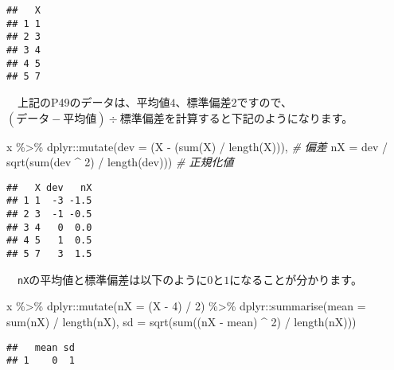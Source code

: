 \documentclass[
  12pt,
]{book}
\newenvironment{Shaded}{\begin{snugshade}}{\end{snugshade}}
\newcommand{\AttributeTok}[1]{\textcolor[rgb]{0.77,0.63,0.00}{#1}}
\newcommand{\CommentTok}[1]{\textcolor[rgb]{0.56,0.35,0.01}{\textit{#1}}}
\newcommand{\DecValTok}[1]{\textcolor[rgb]{0.00,0.00,0.81}{#1}}
\newcommand{\FunctionTok}[1]{\textcolor[rgb]{0.00,0.00,0.00}{#1}}
\newcommand{\NormalTok}[1]{#1}
\newcommand{\SpecialCharTok}[1]{\textcolor[rgb]{0.00,0.00,0.00}{#1}}
\begin{document}
\begin{verbatim}
##   X
## 1 1
## 2 3
## 3 4
## 4 5
## 5 7
\end{verbatim}

　上記のP49のデータは、平均値\(4\)、標準偏差\(2\)ですので、\((データ - 平均値) \div 標準偏差\)を計算すると下記のようになります。

\begin{Shaded}
\begin{Highlighting}[]
\NormalTok{x }\SpecialCharTok{\%\textgreater{}\%} 
\NormalTok{  dplyr}\SpecialCharTok{::}\FunctionTok{mutate}\NormalTok{(}\AttributeTok{dev =}\NormalTok{ (X }\SpecialCharTok{{-}}\NormalTok{ (}\FunctionTok{sum}\NormalTok{(X) }\SpecialCharTok{/} \FunctionTok{length}\NormalTok{(X))),            }\CommentTok{\# 偏差}
                \AttributeTok{nX =}\NormalTok{ dev }\SpecialCharTok{/} \FunctionTok{sqrt}\NormalTok{(}\FunctionTok{sum}\NormalTok{(dev }\SpecialCharTok{\^{}} \DecValTok{2}\NormalTok{) }\SpecialCharTok{/} \FunctionTok{length}\NormalTok{(dev))) }\CommentTok{\# 正規化値}
\end{Highlighting}
\end{Shaded}

\begin{verbatim}
##   X dev   nX
## 1 1  -3 -1.5
## 2 3  -1 -0.5
## 3 4   0  0.0
## 4 5   1  0.5
## 5 7   3  1.5
\end{verbatim}

　\texttt{nX}の平均値と標準偏差は以下のように\(0\)と\(1\)になることが分かります。

\begin{Shaded}
\begin{Highlighting}[]
\NormalTok{x }\SpecialCharTok{\%\textgreater{}\%} 
\NormalTok{  dplyr}\SpecialCharTok{::}\FunctionTok{mutate}\NormalTok{(}\AttributeTok{nX =}\NormalTok{ (X }\SpecialCharTok{{-}} \DecValTok{4}\NormalTok{) }\SpecialCharTok{/} \DecValTok{2}\NormalTok{) }\SpecialCharTok{\%\textgreater{}\%} 
\NormalTok{  dplyr}\SpecialCharTok{::}\FunctionTok{summarise}\NormalTok{(}\AttributeTok{mean =} \FunctionTok{sum}\NormalTok{(nX) }\SpecialCharTok{/} \FunctionTok{length}\NormalTok{(nX),}
                   \AttributeTok{sd =} \FunctionTok{sqrt}\NormalTok{(}\FunctionTok{sum}\NormalTok{((nX }\SpecialCharTok{{-}}\NormalTok{ mean) }\SpecialCharTok{\^{}} \DecValTok{2}\NormalTok{) }\SpecialCharTok{/} \FunctionTok{length}\NormalTok{(nX)))}
\end{Highlighting}
\end{Shaded}

\begin{verbatim}
##   mean sd
## 1    0  1
\end{verbatim}
\end{document}
